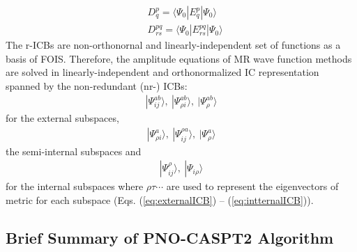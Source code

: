 \documentclass[aip,jcp,amsmath]{revtex4-1}
\begin{document}
%
\begin{align}
  &D^{p}_{q} = \langle\Psi_0|E^{p}_{q}|\Psi_0\rangle  \\
  &D^{pq}_{rs} = \langle\Psi_0|E^{pq}_{rs}|\Psi_0\rangle
\end{align}
%
The r-ICBs are non-orthonornal and linearly-independent set of functions as a basis of FOIS.
%
Therefore, the amplitude equations of MR wave function methods are solved in linearly-independent and orthonormalized IC representation spanned by the non-redundant (nr-) ICBs:
%
\begin{align}
  |\Psi_{ij}^{ab}\rangle,\ |\Psi_{\rho i}^{ab}\rangle,\ |\Psi_{\rho}^{ab}\rangle 
\end{align}
%
for the external subspaces,
%
\begin{align}
  |\Psi_{\rho i}^{a}\rangle,\ |\Psi_{ij}^{\rho a}\rangle,\ |\Psi_{\rho}^{a}\rangle
\end{align}
%
the semi-internal subspaces and
%
\begin{align}
  |\Psi_{ij}^{\rho}\rangle,\ |\Psi_{i\rho}\rangle
\end{align}
%
for the internal subspaces where $\rho\tau\cdots$ are used to represent the eigenvectors of metric for each subspace (Eqs. (\ref{eq:externalICB}) -- (\ref{eq:intternalICB})).

\subsection{Brief Summary of PNO-CASPT2 Algorithm}
\end{document}
